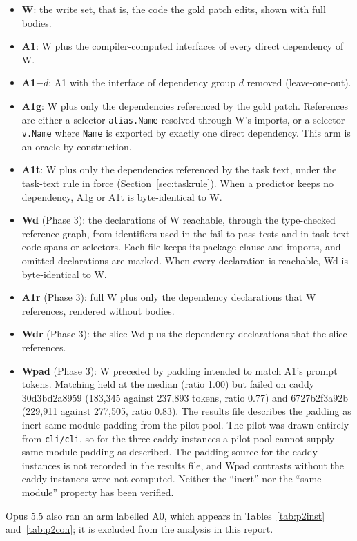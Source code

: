 \begin{itemize}
\item \textbf{W}: the write set, that is, the code the gold patch edits, shown with full bodies.
\item \textbf{A1}: W plus the compiler-computed interfaces of every direct dependency of W.
\item \textbf{A1$-d$}: A1 with the interface of dependency group $d$ removed (leave-one-out).
\item \textbf{A1g}: W plus only the dependencies referenced by the gold patch. References are either a selector \texttt{alias.Name} resolved through W's imports, or a selector \texttt{v.Name} where \texttt{Name} is exported by exactly one direct dependency. This arm is an oracle by construction.
\item \textbf{A1t}: W plus only the dependencies referenced by the task text, under the task-text rule in force (Section~\ref{sec:taskrule}). When a predictor keeps no dependency, A1g or A1t is byte-identical to W.
\item \textbf{Wd} (Phase 3): the declarations of W reachable, through the type-checked reference graph, from identifiers used in the fail-to-pass tests and in task-text code spans or selectors. Each file keeps its package clause and imports, and omitted declarations are marked. When every declaration is reachable, Wd is byte-identical to W.
\item \textbf{A1r} (Phase 3): full W plus only the dependency declarations that W references, rendered without bodies.
\item \textbf{Wdr} (Phase 3): the slice Wd plus the dependency declarations that the slice references.
\item \textbf{Wpad} (Phase 3): W preceded by padding intended to match A1's prompt tokens. Matching held at the median (ratio 1.00) but failed on caddy 30d3bd2a8959 (183,345 against 237,893 tokens, ratio 0.77) and 6727b2f3a92b (229,911 against 277,505, ratio 0.83). The results file describes the padding as inert same-module padding from the pilot pool. The pilot was drawn entirely from \texttt{cli/cli}, so for the three caddy instances a pilot pool cannot supply same-module padding as described. The padding source for the caddy instances is not recorded in the results file, and Wpad contrasts without the caddy instances were not computed. Neither the ``inert'' nor the ``same-module'' property has been verified.
\end{itemize}

Opus 5.5 also ran an arm labelled A0, which appears in Tables~\ref{tab:p2inst} and~\ref{tab:p2con}; it is excluded from the analysis in this report.

